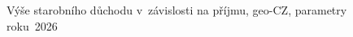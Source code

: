 \def\strProblemyDuchodPrijemCaption{Výše starobního důchodu v~závislosti na příjmu, \acs{geo-CZ}, parametry roku~2026}%
%
\begin{figure}[htbp]
  \centering
  \resizebox{0.95\linewidth}{!}{}
  \caption{\strProblemyDuchodPrijemCaption}
  \label{fig:problemy_duchod_prijem}
\end{figure}
